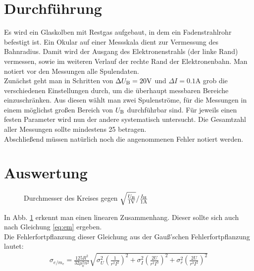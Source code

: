 \documentclass[12pt,a4paper,titlepage,headinclude,bibtotoc]{scrartcl}
\numberwithin{equation}{section}
\begin{document}
\section{Durchführung}
\label{sec:durchfuehrung}
Es wird ein Glaskolben mit Restgas aufgebaut, in dem ein Fadenstrahlrohr befestigt ist.
Ein Okular auf einer Messskala dient zur Vermessung des Bahnradius.
Damit wird der Ausgang des Elektronenstrahls (der linke Rand) vermessen, sowie im weiteren Verlauf der rechte Rand der Elektronenbahn.
Man notiert vor den Messungen alle Spulendaten.\\
Zunächst geht man in Schritten von $\Delta U_\text B=20\si{\volt}$ und $\Delta I=0.1\si{\ampere}$ grob die verschiedenen Einstellungen durch, um die überhaupt messbaren Bereiche einzuschränken.
Aus diesen wählt man zwei Spulenströme, für die Messungen in einem möglichst großen Bereich von $U_\text B$ durchführbar sind.
Für jeweils einen festen Parameter wird nun der andere systematisch untersucht.
Die Gesamtzahl aller Messungen sollte mindestens 25 betragen.\\
Abschließend müssen natürlich noch die angenommenen Fehler notiert werden.




\section{Auswertung}
\label{sec:auswertung}
\begin{figure}[!h]
	\centering
	
	\caption{Durchmesser des Kreises gegen $\sqrt{\frac{U_\text{B}}{1\text V}}/\frac{I_\text{H}}{1\text A}$}
	\label{fig:UI}
\end{figure}
In Abb. \ref{fig:UI} erkennt man einen linearen Zusammenhang.
Dieser sollte sich auch nach Gleichung \eqref{eq:em} ergeben.\\
Die Fehlerfortpflanzung dieser Gleichung aus der Gauß'schen Fehlerfortpflanzung lautet:
\begin{align}
\sigma_{e/m_e}=\frac{125R^2}{32\mu_0^{2}n^2}\sqrt{\sigma_{U}^2\left( \frac{1}{r^2I^2} \right)^2+\sigma_I^2\left( \frac{2U}{r^2I^3} \right)^2+\sigma_r^2\left( \frac{2U}{r^3I^2} \right)^2}
\end{align}
\end{document}
